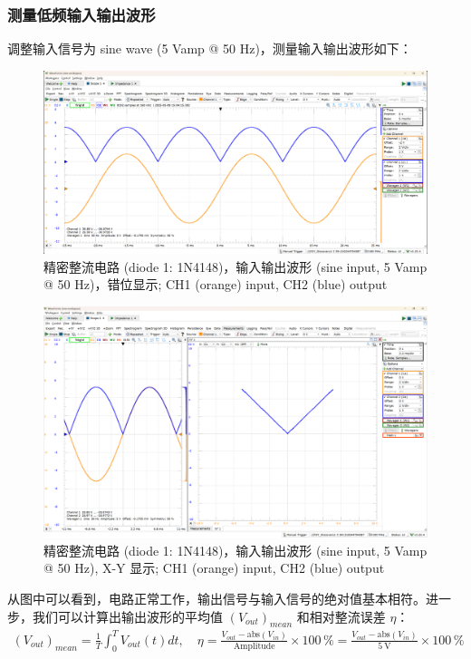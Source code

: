 \documentclass[UTF8]{article}
\begin{document}
\subsubsection{测量低频输入输出波形}

调整输入信号为 sine wave (5 Vamp @ 50 Hz)，测量输入输出波形如下：

\begin{figure}[H]\centering
    \includegraphics[width=\columnwidth]{LCE-05-精密整流/assets/1N4148/1N4148 input-output waveform (50 Hz) 2.png}
    \caption{精密整流电路 (diode 1: 1N4148)，输入输出波形 (sine input, 5 Vamp @ 50 Hz)，错位显示; CH1 (orange) input, CH2 (blue) output}
\end{figure}

\begin{figure}[H]\centering
    \includegraphics[width=\columnwidth]{LCE-05-精密整流/assets/1N4148/1N4148 input-output waveform (50 Hz) 3.png}
    \caption{精密整流电路 (diode 1: 1N4148)，输入输出波形 (sine input, 5 Vamp @ 50 Hz), X-Y 显示; CH1 (orange) input, CH2 (blue) output}
\end{figure}
\vspace*{-3mm}
从图中可以看到，电路正常工作，输出信号与输入信号的绝对值基本相符。进一步，我们可以计算出输出波形的平均值 $(V_{out})_{mean}$ 和相对整流误差 $\eta$：
\begin{gather}
(V_{out})_{mean} = \frac{1}{T}\int_0^T V_{out}(t) dt,\quad 
\eta = \frac{V_{out} - \mathrm{abs}(V_{in})}{\mathrm{Amplitude}}\times 100 \,\% = \frac{V_{out} - \mathrm{abs}(V_{in})}{5 \ \mathrm{V}}\times 100 \,\%
\end{gather}
\end{document}
